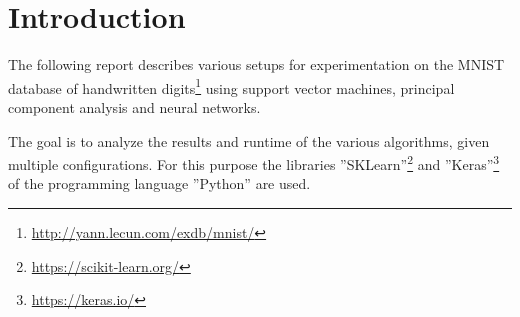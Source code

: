 \chapter{Introduction}
The following report describes various setups for experimentation on the MNIST database of handwritten digits\footnote{\url{http://yann.lecun.com/exdb/mnist/}} using 
support vector machines, principal component analysis and neural networks.

The goal is to analyze the results and runtime of the various algorithms, given multiple configurations.
For this purpose the libraries ''SKLearn''\footnote{\url{https://scikit-learn.org/}} and ''Keras''\footnote{\url{https://keras.io/}} of the programming language ''Python'' are used.


